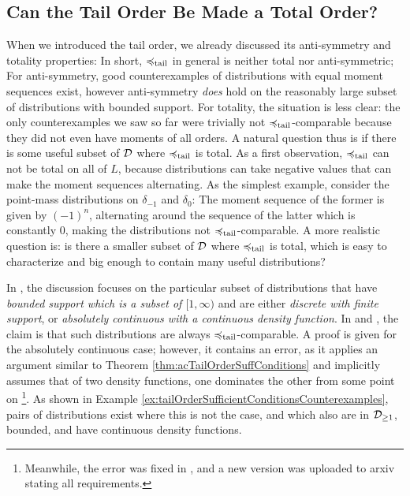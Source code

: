 \documentclass[a4paper]{scrreprt}
\begin{document}
    \subsection{Can the Tail Order Be Made a Total Order?}
    When we introduced the tail order, we already discussed its anti-symmetry and totality properties: In short, $\preccurlyeq_{\text{tail}}$ in general is neither total nor anti-symmetric; For anti-symmetry, good counterexamples of distributions with equal moment sequences exist, however anti-symmetry \emph{does} hold on the reasonably large subset of distributions with bounded support.
    For totality, the situation is less clear: the only counterexamples we saw so far were trivially not $\preccurlyeq_{\text{tail}}$-comparable because they did not even have moments of all orders.
    A natural question thus is if there is some useful subset of $\mathcal{D}$ where $\preccurlyeq_{\text{tail}}$ is total. As a first observation, $\preccurlyeq_{\text{tail}}$ can not be total on all of $L$, because distributions can take negative values that can make the moment sequences alternating. 
    As the simplest example, consider the point-mass distributions on $\delta_{-1}$ and $\delta_{0}$: The moment sequence of the former is given by $(-1)^n$, alternating around the sequence of the latter which is constantly $0$, making the distributions not $\preccurlyeq_{\text{tail}}$-comparable.
    A more realistic question is: is there a smaller subset of $\mathcal{D}$ where $\preccurlyeq_{\text{tail}}$ is total, which is easy to characterize and big enough to contain many useful distributions?
    
    In \cite{bib:rassGameRiskManagI,bib:rassTotalOrderingOnLossDistributions}, the discussion focuses on the particular subset of distributions that have \emph{bounded support which is a subset of $[1, \infty)$} and are either \emph{discrete with finite support}, or \emph{absolutely continuous with a continuous density function}.
    In \cite[Lemma 2]{bib:rassTotalOrderingOnLossDistributions} and \cite[Lemma 2.4]{bib:rassGameRiskManagI}, the claim is that such distributions are always $\preccurlyeq_{\text{tail}}$-comparable.
    A proof is given for the absolutely continuous case; however, it contains an error, as it applies an argument similar to Theorem \ref{thm:acTailOrderSuffConditions} and implicitly assumes that of two density functions, one dominates the other from some point on
    \footnote{Meanwhile, the error was fixed in \cite{bib:rassGameRiskManagI}, and a new version was uploaded to arxiv stating all requirements.}.
    As shown in Example \ref{ex:tailOrderSufficientConditionsCounterexamples}, pairs of distributions exist where this is not the case, and which also are in $\mathcal{D}_{\geq1}$, bounded, and have continuous density functions.
    
\end{document}
